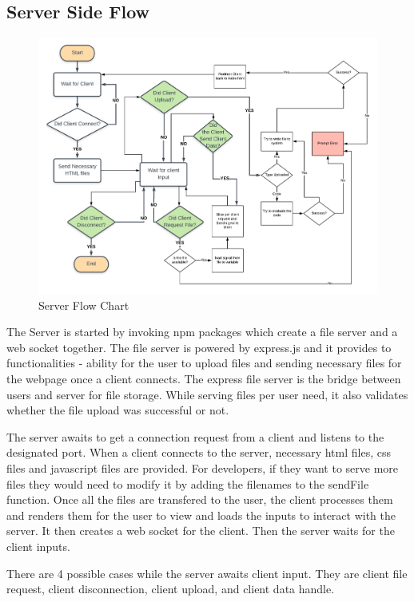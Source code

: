\documentclass[14pt]{extarticle}
\begin{document}
\subsection{Server Side Flow}
\begin{figure}[H]
    \centering
    \includegraphics[scale=0.23]{server}
    \caption{Server Flow Chart}
    \label{fig:Server Flow Chart}
\end{figure}
\par The Server is started by invoking npm packages which create a file server and a web socket together. The file server is powered by express.js and it provides to functionalities - ability for the user to upload files and sending necessary files for the webpage once a client connects. The express file server is the bridge between users and server for file storage. While serving files per user need, it also validates whether the file upload was successful or not.
\par The server awaits to get a connection request from a client and listens to the designated port. When a client connects to the server,  necessary html files, css files and javascript files are provided. For developers, if they want to serve more files they would need to modify it by adding the filenames to the sendFile function. Once all the files are transfered to the user, the client processes them and renders them for the user to view and loads the inputs to interact with the server. It then creates a web socket for the client. Then the server waits for the client inputs. 

\par There are 4 possible cases while the server awaits client input. They are client file request, client disconnection, client upload, and  client data handle. 
\end{document}
